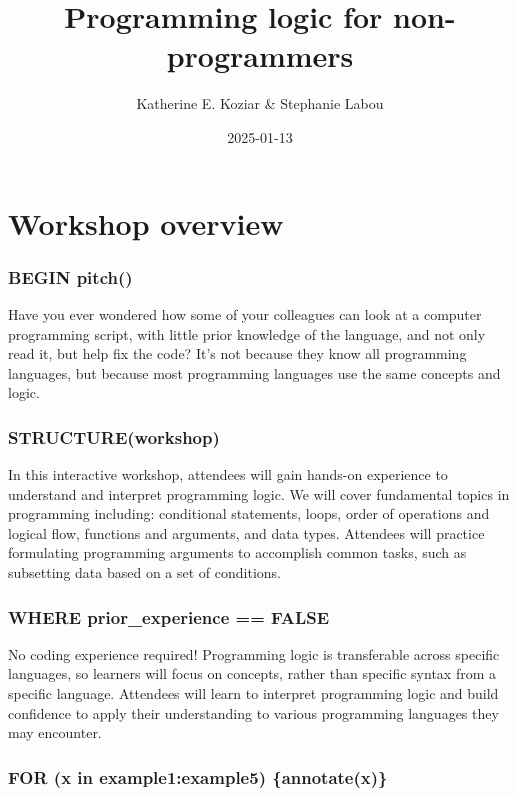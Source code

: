 \documentclass[
]{book}
\title{Programming logic for non-programmers}
\author{Katherine E. Koziar \& Stephanie Labou}
\date{2025-01-13}
\begin{document}
\maketitle

{
\setcounter{tocdepth}{1}
\tableofcontents
}
\chapter{Workshop overview}\label{workshop-overview}

\subsection{BEGIN pitch()}\label{begin-pitch}

Have you ever wondered how some of your colleagues can look at a computer programming script, with little prior knowledge of the language, and not only read it, but help fix the code? It's not because they know all programming languages, but because most programming languages use the same concepts and logic.

\subsection{STRUCTURE(workshop)}\label{structureworkshop}

In this interactive workshop, attendees will gain hands-on experience to understand and interpret programming logic. We will cover fundamental topics in programming including: conditional statements, loops, order of operations and logical flow, functions and arguments, and data types. Attendees will practice formulating programming arguments to accomplish common tasks, such as subsetting data based on a set of conditions.

\subsection{WHERE prior\_experience == FALSE}\label{where-prior_experience-false}

No coding experience required! Programming logic is transferable across specific languages, so learners will focus on concepts, rather than specific syntax from a specific language. Attendees will learn to interpret programming logic and build confidence to apply their understanding to various programming languages they may encounter.

\subsection{FOR (x in example1:example5) \{annotate(x)\}}\label{for-x-in-example1example5-annotatex}
\end{document}
